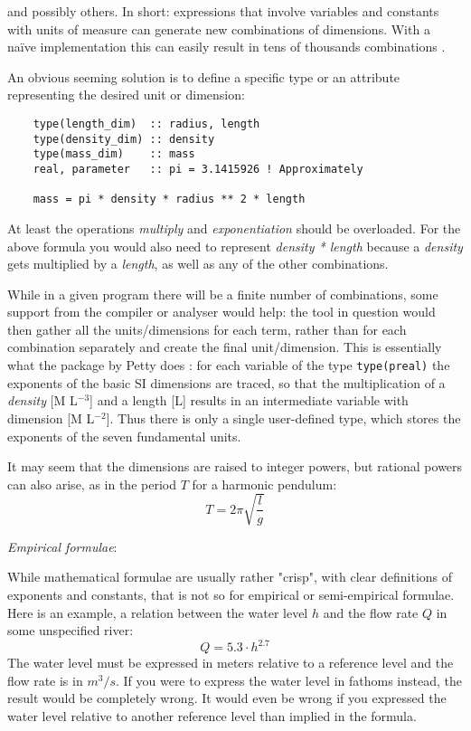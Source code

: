 \documentclass{article}
\begin{document}
\noindent and possibly others. In short: expressions that involve variables and constants with units of measure can generate
new combinations of dimensions. With a na\"ive implementation this can easily result in tens of thousands
combinations \cite{UnitsOfMeasureFortran}.

An obvious seeming solution is to define a specific type or an attribute representing the desired unit or
dimension:

\begin{verbatim}
    type(length_dim)  :: radius, length
    type(density_dim) :: density
    type(mass_dim)    :: mass
    real, parameter   :: pi = 3.1415926 ! Approximately

    mass = pi * density * radius ** 2 * length
\end{verbatim}

At least the operations \emph{multiply} and \emph{exponentiation} should be overloaded.
For the above formula you would also need to represent \emph{density * length} because a \emph{density} gets
multiplied by a \emph{length}, as well as any of the other combinations.

While in a given program there will be a finite number of combinations, some support from the compiler or analyser
would help: the tool in question would then gather all the units/dimensions for each term, rather than for each
combination separately and create the final unit/dimension. This is essentially what the package by Petty
does \cite{PhysUnitsPetty}: for each variable of the type \verb+type(preal)+ the exponents of the basic SI dimensions are traced, so that the
multiplication of a \emph{density} [M L$^{-3}$] and a length [L] results in an intermediate variable with dimension
[M L$^{-2}$]. Thus there is only a single user-defined type, which stores the exponents of the seven fundamental units.

It may seem that the dimensions are raised to integer powers, but rational powers can also arise, as in the period $T$ for
a harmonic pendulum:
\begin{equation}
    T = 2 \pi \sqrt{\frac{l}{g}}
\end{equation}

\vspace{\baselineskip}
\noindent \emph{Empirical formulae}:

\noindent While mathematical formulae are usually rather "crisp", with clear definitions of exponents and constants, that
is not so for empirical or semi-empirical formulae. Here is an example, a relation between the water level $h$ and the
flow rate $Q$ in some unspecified river:
%
\begin{equation}
    Q = 5.3 \cdot h^{2.7}
\end{equation}
%
The water level must be expressed in meters relative to a reference level and the flow rate is in $m^3/s$. If you were
to express the water level in fathoms instead, the result would be completely wrong. It would even be wrong if you
expressed the water level relative to another reference level than implied in the formula.
\end{document}
